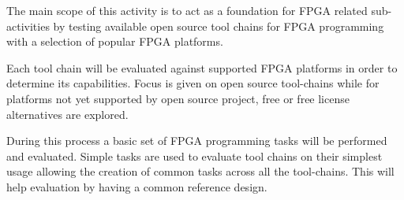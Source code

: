 The main scope of this activity is to act as a foundation for FPGA related sub-activities by testing available open source tool chains for FPGA programming with a selection of popular FPGA platforms.

Each tool chain will be evaluated against supported FPGA platforms in order to determine its capabilities. Focus is given on open source tool-chains while for platforms not yet supported by open source project, free or free license alternatives are explored.

During this process a basic set of FPGA programming tasks will be performed and evaluated. Simple tasks are used to evaluate tool chains on their simplest usage allowing the creation of common tasks across all the tool-chains. This will help evaluation by having a common reference design.